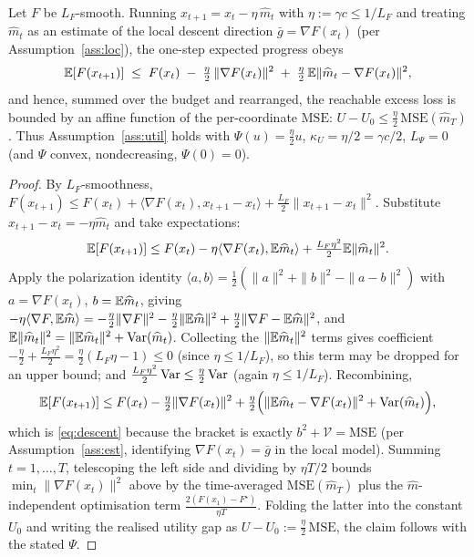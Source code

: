 \begin{lemma}\label{lem:util}
Let $F$ be $L_F$-smooth. Running $x_{t+1}=x_t-\eta\,\widehat m_t$ with $\eta:=\gamma c\le 1/L_F$ and
treating $\widehat m_t$ as an estimate of the local descent direction $\bar g=\nabla F(x_t)$
(per Assumption~\ref{ass:loc}), the one-step expected progress obeys
\begin{equation}
\label{eq:descent}
\mathbb{E}[F(x_{t+1})]\;\le\;F(x_t)\;-\;\tfrac{\eta}{2}\,\|\nabla F(x_t)\|^2\;+\;\tfrac{\eta}{2}\,\mathbb{E}\|\widehat m_t-\nabla F(x_t)\|^2 ,
\end{equation}
and hence, summed over the budget and rearranged, the reachable excess loss is bounded by an affine
function of the per-coordinate $\mathrm{MSE}$: $U-U_0\le \tfrac{\eta}{2}\,\mathrm{MSE}(\widehat m_T)$.
Thus Assumption~\ref{ass:util} holds with $\Psi(u)=\tfrac{\eta}{2}u$, $\kappa_U=\eta/2=\gamma c/2$,
$L_\Psi=0$ (and $\Psi$ convex, nondecreasing, $\Psi(0)=0$).
\end{lemma}
\begin{proof}
By $L_F$-smoothness, $F(x_{t+1})\le F(x_t)+\langle\nabla F(x_t),x_{t+1}-x_t\rangle
+\tfrac{L_F}{2}\|x_{t+1}-x_t\|^2$. Substitute $x_{t+1}-x_t=-\eta\widehat m_t$ and take expectations:
\[
\mathbb{E}[F(x_{t+1})]\le F(x_t)-\eta\langle\nabla F(x_t),\mathbb{E}\widehat m_t\rangle+\tfrac{L_F\eta^2}{2}\mathbb{E}\|\widehat m_t\|^2 .
\]
Apply the polarization identity
$\langle a,b\rangle=\tfrac12(\|a\|^2+\|b\|^2-\|a-b\|^2)$ with $a=\nabla F(x_t)$, $b=\mathbb{E}\widehat m_t$,
giving $-\eta\langle\nabla F,\mathbb{E}\widehat m\rangle=-\tfrac\eta2\|\nabla F\|^2-\tfrac\eta2\|\mathbb{E}\widehat m\|^2+\tfrac\eta2\|\nabla F-\mathbb{E}\widehat m\|^2$,
and $\mathbb{E}\|\widehat m_t\|^2=\|\mathbb{E}\widehat m_t\|^2+\operatorname{Var}(\widehat m_t)$. Collecting the $\|\mathbb{E}\widehat m_t\|^2$
terms gives coefficient $-\tfrac\eta2+\tfrac{L_F\eta^2}{2}=\tfrac\eta2(L_F\eta-1)\le0$ (since
$\eta\le1/L_F$), so this term may be dropped for an upper bound; and
$\tfrac{L_F\eta^2}{2}\operatorname{Var}\le\tfrac{\eta}{2}\operatorname{Var}$ (again $\eta\le1/L_F$). Recombining,
\[
\mathbb{E}[F(x_{t+1})]\le F(x_t)-\tfrac{\eta}{2}\|\nabla F(x_t)\|^2+\tfrac{\eta}{2}\Big(\|\mathbb{E}\widehat m_t-\nabla F(x_t)\|^2+\operatorname{Var}(\widehat m_t)\Big),
\]
which is \eqref{eq:descent} because the bracket is exactly $b^2+\mathcal V=\mathrm{MSE}$ (per
Assumption~\ref{ass:est}, identifying $\nabla F(x_t)=\bar g$ in the local model). Summing
$t=1,\dots,T$, telescoping the left side and dividing by $\eta T/2$ bounds
$\min_t\|\nabla F(x_t)\|^2$ above by the time-averaged $\mathrm{MSE}(\widehat m_T)$ plus the
$\widehat m$-independent optimisation term $\tfrac{2(F(x_1)-F^\star)}{\eta T}$. Folding the latter
into the constant $U_0$ and writing the realised utility gap as $U-U_0:=\tfrac\eta2\,\mathrm{MSE}$,
the claim follows with the stated $\Psi$.
\end{proof}

